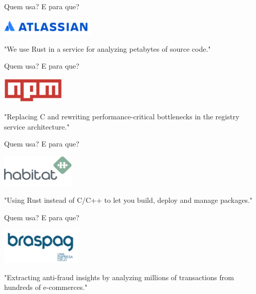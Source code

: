 \documentclass[aspectratio=169]{beamer}
\begin{document}
\begin{frame}{Quem usa? E para que?}
	\begin{center}
		\includegraphics[width=4.5cm]{imgs/atlassian.png}	
		
		"We use Rust in a service for analyzing petabytes of source code."
	\end{center}
\end{frame}

\begin{frame}{Quem usa? E para que?}
	\begin{center}
		\includegraphics[width=3.0cm]{imgs/npm.jpeg}	
		
		"Replacing C and rewriting performance-critical bottlenecks in the registry service architecture."
	\end{center}
\end{frame}

\begin{frame}{Quem usa? E para que?}
	\begin{center}
		\includegraphics[width=3.5cm]{imgs/habitat.png}	
		
		"Using Rust instead of C/C++ to let you build, deploy and manage packages."
	\end{center}
\end{frame}

\begin{frame}{Quem usa? E para que?}
	\begin{center}
		\includegraphics[width=3.8cm]{imgs/logo.png}	
		
		"Extracting anti-fraud insights by analyzing millions of transactions from hundreds of e-commerces."
	\end{center}
\end{frame}
\end{document}
